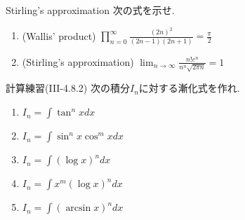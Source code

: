 \begin{itembox}[l]{Stirling's approximation}
  次の式を示せ.
  \begin{enumerate}
    \item (Wallis' product) \(\prod_{n=0}^{\infty}\frac{(2n)^2}{(2n-1)(2n+1)}=\frac{\pi}{2}\)
    \item (Stirling's approximation) \(\lim_{n\to\infty}\frac{n!e^n}{n^n\sqrt{2\pi{n}}}=1\)
  \end{enumerate}
\end{itembox}

\begin{itembox}[l]{計算練習(III-4.8.2)}
  次の積分\(I_n\)に対する漸化式を作れ.
  \begin{enumerate}
    \item \(I_n=\int\tan^n{x}dx\)
    \item \(I_n=\int\sin^n{x}\cos^m{x}dx\)
    \item \(I_n=\int(\log{x})^{n}dx\)
    \item \(I_n=\int{x}^{m}(\log{x})^{n}dx\)
    \item \(I_n=\int(\arcsin{x})^{n}dx\)
  \end{enumerate}
\end{itembox}

